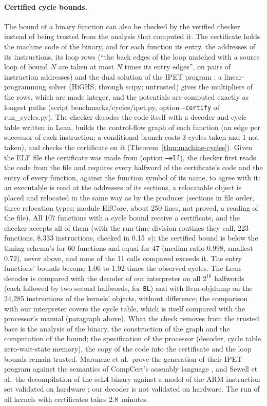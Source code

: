 \documentclass[oneside,english]{amsart}
\numberwithin{equation}{section}
\theoremstyle{plain}
\theoremstyle{definition}
\theoremstyle{plain}
\theoremstyle{plain}
\theoremstyle{remark}
\newcommand{\lean}[1]{{\ttfamily\small #1}}
\begin{document}
\paragraph{Certified cycle bounds.}
The bound of a binary function can also be checked by the verified checker instead of being trusted from the analysis that computed it. The certificate holds the machine code of the binary, and for each function its entry, the addresses of its instructions, its loop rows (``the back edges of the loop matched with a source loop of bound $N$ are taken at most $N$ times its entry edges'', on pairs of instruction addresses) and the dual solution of the IPET program \cite{li1995ilp}: a linear-programming solver (HiGHS, through scipy; untrusted) gives the multipliers of the rows, which are made integer, and the potentials are computed exactly as longest paths (script \lean{benchmarks/cycles/ipet.py}, option \texttt{--certify} of \lean{run\_cycles.py}). The checker decodes the code itself with a decoder and cycle table written in Lean, builds the control-flow graph of each function (an edge per successor of each instruction; a conditional branch costs 3 cycles taken and 1 not taken), and checks the certificate on it (Theorem~\ref{thm:machine-cycles}). Given the ELF file the certificate was made from (option \texttt{--elf}), the checker first reads the code from the file and requires every halfword of the certificate's code and the entry of every function, against the function symbol of its name, to agree with it: an executable is read at the addresses of its sections, a relocatable object is placed and relocated in the same way as by the producer (sections in file order, three relocation types; module \lean{ElfCore}, about 250 lines, not proved, a reading of the file). All 107 functions with a cycle bound receive a certificate, and the checker accepts all of them (with the run-time division routines they call, 223 functions, 8{,}333 instructions, checked in 0.15~s); the certified bound is below the timing schema's for 60 functions and equal for 47 (median ratio 0.998, smallest 0.72), never above, and none of the 11 calls compared exceeds it. The entry functions' bounds become 1.06 to 1.92 times the observed cycles. The Lean decoder is compared with the decoder of our interpreter on all $2^{16}$ halfwords (each followed by two second halfwords, for \texttt{BL}) and with llvm-objdump on the 24{,}285 instructions of the kernels' objects, without difference; the comparison with our interpreter covers the cycle table, which is itself compared with the processor's manual (paragraph above). What the check removes from the trusted base is the analysis of the binary, the construction of the graph and the computation of the bound; the specification of the processor (decoder, cycle table, zero-wait-state memory), the copy of the code into the certificate and the loop bounds remain trusted. Maroneze et al.\ prove the generation of their IPET program against the semantics of CompCert's assembly language \cite{maroneze2014formally}, and Sewell et al.\ the decompilation of the seL4 binary against a model of the ARM instruction set validated on hardware \cite{sewell2017high,fox2010trustworthy}; our decoder is not validated on hardware. The run of all kernels with certificates takes 2.8~minutes.
\end{document}
